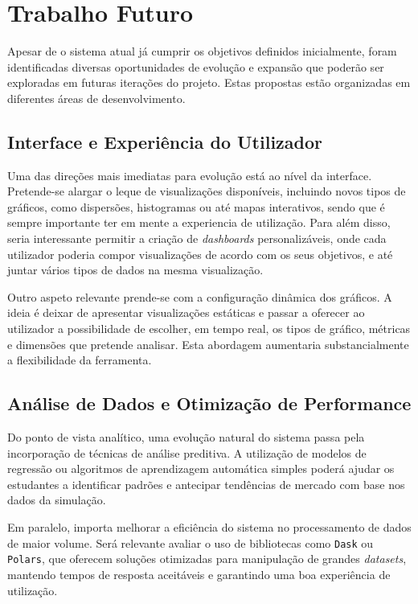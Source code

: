 \section{Trabalho Futuro}

Apesar de o sistema atual já cumprir os objetivos definidos inicialmente, foram identificadas diversas oportunidades de evolução e expansão que poderão ser exploradas em futuras iterações do projeto. Estas propostas estão organizadas em diferentes áreas de desenvolvimento.

\subsection{Interface e Experiência do Utilizador}

Uma das direções mais imediatas para evolução está ao nível da interface. Pretende-se alargar o leque de visualizações disponíveis, incluindo novos tipos de gráficos, como dispersões, histogramas ou até mapas interativos, sendo que é sempre importante ter em mente a experiencia de utilização. Para além disso, seria interessante permitir a criação de \textit{dashboards} personalizáveis, onde cada utilizador poderia compor visualizações de acordo com os seus objetivos, e até juntar vários tipos de dados na mesma visualização.

Outro aspeto relevante prende-se com a configuração dinâmica dos gráficos. A ideia é deixar de apresentar visualizações estáticas e passar a oferecer ao utilizador a possibilidade de escolher, em tempo real, os tipos de gráfico, métricas e dimensões que pretende analisar. Esta abordagem aumentaria substancialmente a flexibilidade da ferramenta.

\subsection{Análise de Dados e Otimização de Performance}

Do ponto de vista analítico, uma evolução natural do sistema passa pela incorporação de técnicas de análise preditiva. A utilização de modelos de regressão ou algoritmos de aprendizagem automática simples poderá ajudar os estudantes a identificar padrões e antecipar tendências de mercado com base nos dados da simulação.

Em paralelo, importa melhorar a eficiência do sistema no processamento de dados de maior volume. Será relevante avaliar o uso de bibliotecas como \texttt{Dask} ou \texttt{Polars}, que oferecem soluções otimizadas para manipulação de grandes \textit{datasets}, mantendo tempos de resposta aceitáveis e garantindo uma boa experiência de utilização.

